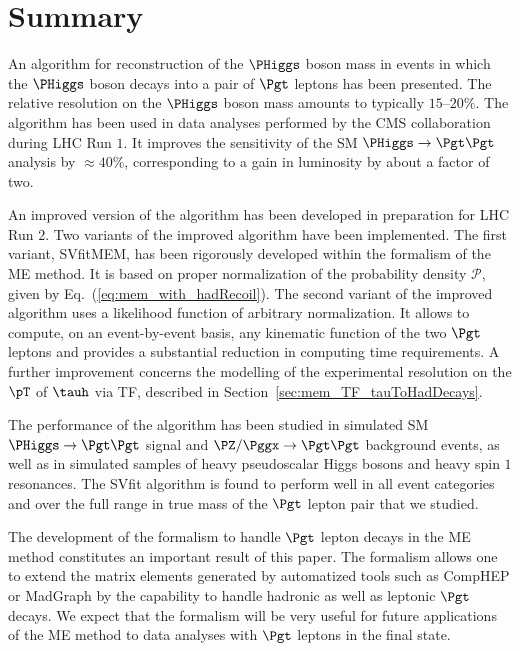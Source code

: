 \section{Summary}
\label{sec:summary}

An algorithm for reconstruction of the $\PHiggs$ boson mass in events
in which the $\PHiggs$ boson decays into a pair of $\Pgt$ leptons has been
presented.
The relative resolution on the $\PHiggs$ boson mass amounts to typically
$15$--$20\%$.
The algorithm has been used in data analyses performed by the CMS
collaboration during LHC Run $1$.
It improves the sensitivity of the SM $\PHiggs \to \Pgt\Pgt$ analysis by $\approx 40\%$,
corresponding to a gain in luminosity by about a factor of two.

An improved version of the algorithm has been developed in preparation
for LHC Run $2$.
Two variants of the improved algorithm have been implemented.
The first variant, SVfitMEM, has been rigorously developed within the
formalism of the ME method. It is based on proper normalization of the probability density 
$\mathcal{P}$, given by Eq.~(\ref{eq:mem_with_hadRecoil}).
The second variant of the improved algorithm uses a likelihood
function of arbitrary normalization.
It allows to compute, on an event-by-event basis, any kinematic
function of the two $\Pgt$ leptons and provides a substantial reduction in computing time requirements.
A further improvement concerns the modelling of the experimental
resolution on the $\pT$ of $\tauh$ via TF, described in
Section~\ref{sec:mem_TF_tauToHadDecays}.

The performance of the algorithm has been studied in simulated SM
$\PHiggs \to \Pgt\Pgt$ signal and $\PZ/\Pggx \to \Pgt\Pgt$ background
events, as well as in simulated samples of heavy pseudoscalar Higgs
bosons and heavy spin $1$ resonances.
The SVfit algorithm is found to perform well in all event
categories and over the full range in true mass of the $\Pgt$ lepton
pair that we studied.

The development of the formalism to handle $\Pgt$ lepton decays
in the ME method constitutes an important result of this paper.
The formalism allows one to extend the matrix elements generated by automatized tools such as
CompHEP or MadGraph by the capability to handle hadronic as well as leptonic $\Pgt$ decays.
We expect that the formalism will be very useful for future
applications of the ME method to data analyses with $\Pgt$ leptons in
the final state. 

